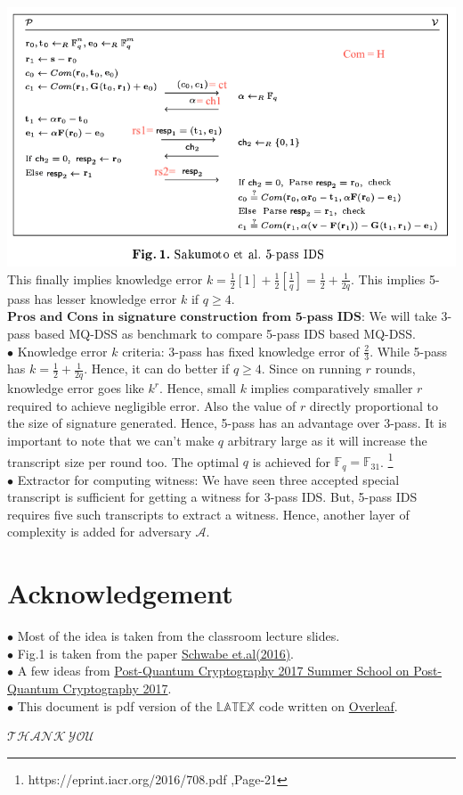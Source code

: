 \documentclass{article}
\begin{document}
\includegraphics[width=1\textwidth]{5_pass_ids.png}
This finally implies knowledge error $k = \frac{1}{2}[1]+\frac{1}{2}[\frac{1}{q}] = \frac{1}{2} + \frac{1}{2q}$. This implies 5-pass has lesser knowledge error $k$ if $q\geq 4$.\\

$\textbf{Pros and Cons in signature construction from 5-pass IDS:}$ We will take 3-pass based MQ-DSS as benchmark to compare 5-pass IDS based MQ-DSS.\\
$\bullet$ Knowledge error $k$ criteria: 3-pass has fixed knowledge error of $\frac{2}{3}$. While 5-pass has $k = \frac{1}{2} + \frac{1}{2q}$. Hence, it can do better if $q\geq4$. Since on running $r$ rounds, knowledge error goes like $k^r$. Hence, small $k$ implies comparatively smaller $r$ required to achieve negligible error. Also the value of $r$ directly proportional to the size of signature generated. Hence, 5-pass has an advantage over 3-pass. It is important to note that we can't make $q$ arbitrary large as it will increase the transcript size per round too. The optimal $q$ is achieved for $\mathbb{F}_q = \mathbb{F}_{31}$. \footnote{https://eprint.iacr.org/2016/708.pdf ,Page-21} \\
$\bullet$ Extractor for computing witness: We have seen three accepted special transcript is sufficient for getting a witness for 3-pass IDS. But, 5-pass IDS requires five such transcripts to extract a witness. Hence, another layer of complexity is added for adversary $\mathcal{A}.$ 


\section*{Acknowledgement}
$\bullet$ Most of the idea is taken from the classroom lecture slides.\\
$\bullet$ Fig.1 is taken from the paper \hyperlink{https://eprint.iacr.org/2016/708.pdf}{Schwabe et.al(2016)}.\\
$\bullet$ A few ideas from \hyperlink{https://2017.pqcrypto.org/school/schedule.html}{Post-Quantum Cryptography 2017 Summer School on Post-Quantum Cryptography 2017}.
\\
$\bullet$ This document is pdf version of the $\mathbb{LATEX}$ code written on \hyperlink{https://www.overleaf.com/read/tmqfgrkddzkj}{Overleaf}.\\
\begin{center}
   $\mathcal{THANK\ YOU}$
\end{center} 
                                       
\end{document}
